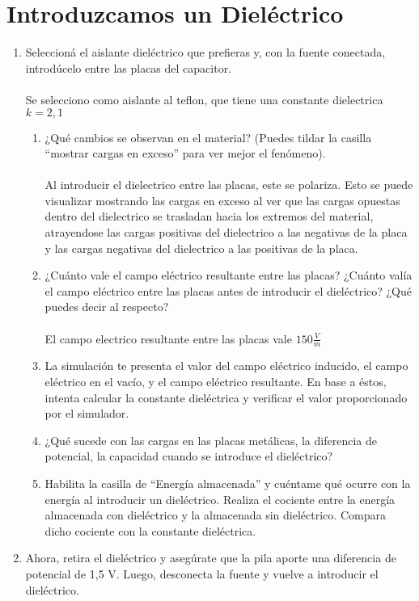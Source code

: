 \documentclass[12pt]{report}
\begin{document}
\section{Introduzcamos un Dieléctrico}

\begin{enumerate}
    \item Seleccioná el aislante dieléctrico que prefieras y, con la fuente conectada, introdúcelo entre las placas del capacitor.
        \\\\Se selecciono como aislante al teflon, que tiene una constante dielectrica $k = 2,1$
    \begin{enumerate}
        \item ¿Qué cambios se observan en el material? (Puedes tildar la casilla “mostrar cargas en exceso” para ver mejor el fenómeno).
        \\\\Al introducir el dielectrico entre las placas, este se polariza. Esto se puede visualizar mostrando las cargas en exceso al ver que las cargas opuestas dentro del dielectrico se trasladan hacia los extremos del material, atrayendose las cargas positivas del dielectrico a las negativas de la placa y las cargas negativas del dielectrico a las positivas de la placa.
        \item ¿Cuánto vale el campo eléctrico resultante entre las placas? ¿Cuánto valía el campo eléctrico entre las placas antes de introducir el dieléctrico? ¿Qué puedes decir al respecto?
        \\\\El campo electrico resultante entre las placas vale $150 \frac{V}{m}$
        \item La simulación te presenta el valor del campo eléctrico inducido, el campo eléctrico en el vacío, y el campo eléctrico resultante. En base a éstos, intenta calcular la constante dieléctrica y verificar el valor proporcionado por el simulador.
        \item ¿Qué sucede con las cargas en las placas metálicas, la diferencia de potencial, la capacidad cuando se introduce el dieléctrico?
        \item Habilita la casilla de “Energía almacenada” y cuéntame qué ocurre con la energía al introducir un dieléctrico. Realiza el cociente entre la energía almacenada con dieléctrico y la almacenada sin dieléctrico. Compara dicho cociente con la constante dieléctrica.
    \end{enumerate}
    \item Ahora, retira el dieléctrico y asegúrate que la pila aporte una diferencia de potencial de 1,5 V. Luego, desconecta la fuente y vuelve a introducir el dieléctrico.

\end{enumerate}
\end{document}
